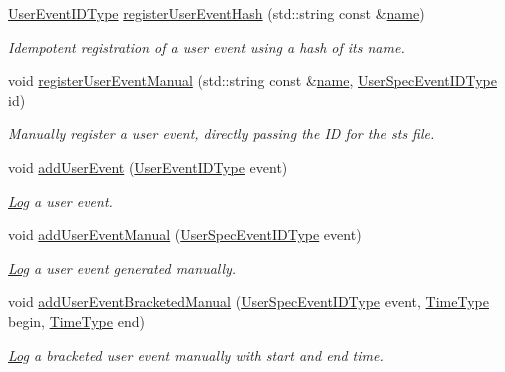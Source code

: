 \begin{DoxyCompactItemize}
\hyperlink{namespacevt_1_1trace_a5908920d051c144c89f17c69ed262350}{User\+Event\+I\+D\+Type} \hyperlink{structvt_1_1trace_1_1_trace_a1b80a8ca6bebbfbe61f8b119342e14f7}{register\+User\+Event\+Hash} (std\+::string const \&\hyperlink{structvt_1_1trace_1_1_trace_aaae4bbf6d009229a5c8b9db67a127942}{name})
\begin{DoxyCompactList}\small\item\em Idempotent registration of a user event using a hash of its name. \end{DoxyCompactList}\item 
void \hyperlink{structvt_1_1trace_1_1_trace_ade8d39718f60924f1aeb178ccda56cbc}{register\+User\+Event\+Manual} (std\+::string const \&\hyperlink{structvt_1_1trace_1_1_trace_aaae4bbf6d009229a5c8b9db67a127942}{name}, \hyperlink{namespacevt_1_1trace_a70c43e0e1596eea236912d4197d3120a}{User\+Spec\+Event\+I\+D\+Type} id)
\begin{DoxyCompactList}\small\item\em Manually register a user event, directly passing the ID for the sts file. \end{DoxyCompactList}\item 
void \hyperlink{structvt_1_1trace_1_1_trace_a0a4bbdf7bd3c2b8742cbceb24389a4c0}{add\+User\+Event} (\hyperlink{namespacevt_1_1trace_a5908920d051c144c89f17c69ed262350}{User\+Event\+I\+D\+Type} event)
\begin{DoxyCompactList}\small\item\em \hyperlink{structvt_1_1trace_1_1_log}{Log} a user event. \end{DoxyCompactList}\item 
void \hyperlink{structvt_1_1trace_1_1_trace_a2d9fac6bd71ba67e4f87b7efd7c6c6c7}{add\+User\+Event\+Manual} (\hyperlink{namespacevt_1_1trace_a70c43e0e1596eea236912d4197d3120a}{User\+Spec\+Event\+I\+D\+Type} event)
\begin{DoxyCompactList}\small\item\em \hyperlink{structvt_1_1trace_1_1_log}{Log} a user event generated manually. \end{DoxyCompactList}\item 
void \hyperlink{structvt_1_1trace_1_1_trace_a2b60820d8b8d4eb8b5b4682aff5039bc}{add\+User\+Event\+Bracketed\+Manual} (\hyperlink{namespacevt_1_1trace_a70c43e0e1596eea236912d4197d3120a}{User\+Spec\+Event\+I\+D\+Type} event, \hyperlink{namespacevt_a2b9f28078dc309ad0706b69ded743e69}{Time\+Type} begin, \hyperlink{namespacevt_a2b9f28078dc309ad0706b69ded743e69}{Time\+Type} end)
\begin{DoxyCompactList}\small\item\em \hyperlink{structvt_1_1trace_1_1_log}{Log} a bracketed user event manually with start and end time. \end{DoxyCompactList}\item 

\end{DoxyCompactItemize}
